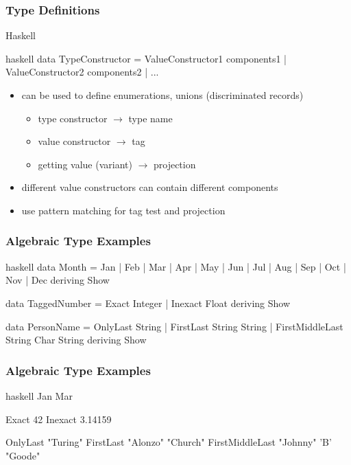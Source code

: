\documentclass[dvipsnames]{beamer}
\theoremstyle{plain}
\begin{document}
\begin{frame}[fragile]
  \frametitle{Type Definitions}

  \begin{block}{Haskell}
    \begin{pygments}{haskell}
data TypeConstructor = ValueConstructor1 components1
                     | ValueConstructor2 components2
                     | ...
    \end{pygments}
  \end{block}

  \pause
  \begin{itemize}
    \item can be used to define enumerations, unions (discriminated records)
    \begin{itemize}
      \item type constructor $\rightarrow$ type name
      \item value constructor $\rightarrow$ tag
      \item getting value (variant) $\rightarrow$ projection
    \end{itemize}
    \item different value constructors can contain different components
    \item use pattern matching for tag test and projection
  \end{itemize}
\end{frame}

\begin{frame}[fragile]
  \frametitle{Algebraic Type Examples}

  \begin{example}
    \begin{pygments}{haskell}
data Month = Jan | Feb | Mar | Apr | May | Jun
           | Jul | Aug | Sep | Oct | Nov | Dec
           deriving Show

data TaggedNumber = Exact Integer | Inexact Float
                    deriving Show

data PersonName = OnlyLast String
                | FirstLast String String
                | FirstMiddleLast String Char String
                deriving Show
    \end{pygments}
  \end{example}
\end{frame}

\begin{frame}[fragile]
  \frametitle{Algebraic Type Examples}

  \begin{example}
    \begin{pygments}{haskell}
Jan
Mar

Exact 42
Inexact 3.14159

OnlyLast "Turing"
FirstLast "Alonzo" "Church"
FirstMiddleLast "Johnny" 'B' "Goode"
    \end{pygments}
  \end{example}
\end{frame}
\end{document}
